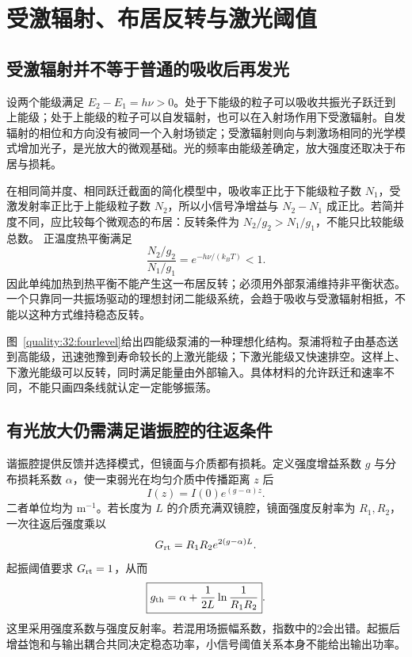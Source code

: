 \section{受激辐射、布居反转与激光阈值}

\subsection{受激辐射并不等于普通的吸收后再发光}
设两个能级满足 $E_2-E_1=h\nu>0$。处于下能级的粒子可以吸收共振光子跃迁到上能级；处于上能级的粒子可以自发辐射，也可以在入射场作用下受激辐射。自发辐射的相位和方向没有被同一个入射场锁定；受激辐射则向与刺激场相同的光学模式增加光子，是光放大的微观基础。光的频率由能级差确定，放大强度还取决于布居与损耗。

在相同简并度、相同跃迁截面的简化模型中，吸收率正比于下能级粒子数 $N_1$，受激发射率正比于上能级粒子数 $N_2$，所以小信号净增益与 $N_2-N_1$ 成正比。若简并度不同，应比较每个微观态的布居：反转条件为 $N_2/g_2>N_1/g_1$，不能只比较能级总数。
正温度热平衡满足
\[
 \frac{N_2/g_2}{N_1/g_1}=e^{-h\nu/(k_BT)}<1.
\]
因此单纯加热到热平衡不能产生这一布居反转；必须用外部泵浦维持非平衡状态。一个只靠同一共振场驱动的理想封闭二能级系统，会趋于吸收与受激辐射相抵，不能以这种方式维持稳态反转。

图~\ref{quality:32:fourlevel}给出四能级泵浦的一种理想化结构。泵浦将粒子由基态送到高能级，迅速弛豫到寿命较长的上激光能级；下激光能级又快速排空。这样上、下激光能级可以反转，同时满足能量由外部输入。具体材料的允许跃迁和速率不同，不能只画四条线就认定一定能够振荡。
\begin{qualityfigure}
\label{quality:32:fourlevel}
\end{qualityfigure}

\subsection{有光放大仍需满足谐振腔的往返条件}
谐振腔提供反馈并选择模式，但镜面与介质都有损耗。定义强度增益系数 $g$ 与分布损耗系数 $\alpha$，使一束弱光在均匀介质中传播距离 $z$ 后
\[
 I(z)=I(0)e^{(g-\alpha)z}.
\]
二者单位均为 $\mathrm{m^{-1}}$。若长度为 $L$ 的介质充满双镜腔，镜面强度反射率为 $R_1,R_2$，一次往返后强度乘以
\[
 G_{\rm rt}=R_1R_2e^{2(g-\alpha)L}.
\]
起振阈值要求 $G_{\rm rt}=1$，从而
\[
 \boxed{g_{\rm th}=\alpha+\frac1{2L}\ln\frac1{R_1R_2}}.
\]
这里采用强度系数与强度反射率。若混用场振幅系数，指数中的2会出错。起振后增益饱和与输出耦合共同决定稳态功率，小信号阈值关系本身不能给出输出功率。

